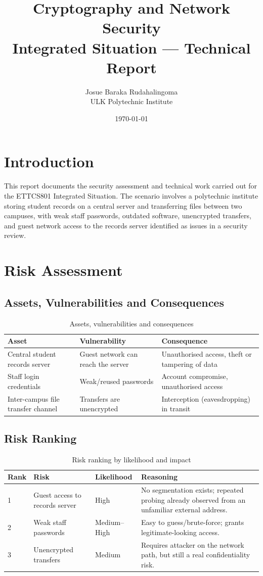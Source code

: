 \documentclass[11pt]{article}
\title{Cryptography and Network Security \\ \large Integrated Situation --- Technical Report}
\author{Josue Baraka Rudahalingoma \\ ULK Polytechnic Institute}
\date{\today}
\begin{document}
\maketitle

\section{Introduction}
This report documents the security assessment and technical work carried out for the ETTCS801 Integrated Situation. The scenario involves a polytechnic institute storing student records on a central server and transferring files between two campuses, with weak staff passwords, outdated software, unencrypted transfers, and guest network access to the records server identified as issues in a security review.

\section{Risk Assessment}

\subsection{Assets, Vulnerabilities and Consequences}
\begin{table}[h]
\centering
\begin{tabular}{lll}
\toprule
Asset & Vulnerability & Consequence \\
\midrule
Central student records server & Guest network can reach the server & Unauthorised access, theft or tampering of data \\
Staff login credentials & Weak/reused passwords & Account compromise, unauthorised access \\
Inter-campus file transfer channel & Transfers are unencrypted & Interception (eavesdropping) in transit \\
\bottomrule
\end{tabular}
\caption{Assets, vulnerabilities and consequences}
\end{table}

\subsection{Risk Ranking}
\begin{table}[h]
\centering
\begin{tabular}{lllp{5cm}}
\toprule
Rank & Risk & Likelihood & Reasoning \\
\midrule
1 & Guest access to records server & High & No segmentation exists; repeated probing already observed from an unfamiliar external address. \\
2 & Weak staff passwords & Medium--High & Easy to guess/brute-force; grants legitimate-looking access. \\
3 & Unencrypted transfers & Medium & Requires attacker on the network path, but still a real confidentiality risk. \\
\bottomrule
\end{tabular}
\caption{Risk ranking by likelihood and impact}
\end{table}
\end{document}
